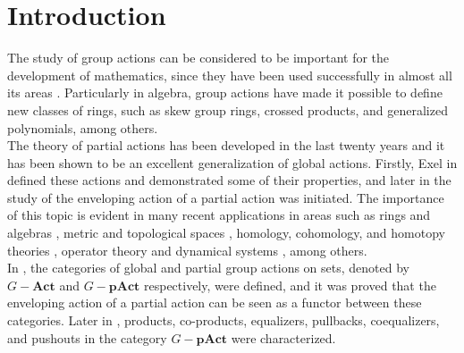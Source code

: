 \documentclass[sn-mathphys-num]{sn-jnl}%
\theoremstyle{thmstyleone}%
\theoremstyle{thmstyletwo}%
\theoremstyle{thmstylethree}%
\begin{document}
\section{Introduction}
The study of group actions can be considered to be important for the development of mathematics, since they have been used successfully in almost all its areas \cite{hand1, kerber}. Particularly in algebra, group actions have made it possible to define new classes of rings, such as skew group rings, crossed products, and generalized polynomials, among others.\\

The theory of partial actions has been developed in the last twenty years and it has been shown to be an excellent generalization of global actions. Firstly, Exel in \cite{Exel} defined these actions and demonstrated some of their properties, and later in \cite{Abadie1,Abadie2,Kellendonk} the study of the enveloping action of a partial action was initiated. The importance of this topic is evident in many recent applications in areas such as rings and algebras \cite{Alves-Batista-Dokuchaev-Paques,Bagio-Pinedo, Dokuchaev1,Dokuchaev2,Dokuchaev-Vilca,Ferrero,Jian-Kuo-Szeto}, metric and topological spaces \cite{Abadie2,Choi,Megrelishvili-Schroder,Pinedo-Uzcategui}, homology, cohomology, and homotopy theories \cite{Dokuchaev-Khrypchenko,Dokuchaev-Novikov-Pinedo,Steinberg}, operator theory and dynamical systems \cite{Abadie2,Exel2,Rainone}, among others.\\

In \cite{Ovalle}, the categories of global and partial group actions on sets, denoted by $G-\mathbf{Act}$ and $G-\mathbf{pAct}$ respectively, were defined, and it was proved that the enveloping action of a partial action can be seen as a functor between these categories. Later in \cite{Avila1}, products, co-products, equalizers, pullbacks, coequalizers, and pushouts  in the category $G-\mathbf{pAct}$ were characterized.\\
\end{document}
